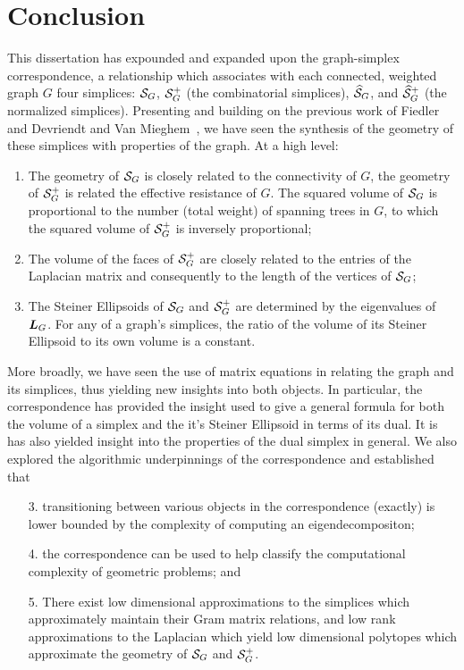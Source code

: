 \chapter{Conclusion}
\label{chap:conclusion}



This dissertation has expounded  and  expanded upon the graph-simplex correspondence, a relationship which associates with each connected, weighted graph $G$ four simplices: $\mathcal{S}_G$, $\mathcal{S}_G^+$ (the combinatorial simplices), $\widehat{\mathcal{S}}_G$, and $\widehat{\mathcal{S}}_G^+$ (the normalized simplices).  
Presenting and building on  the previous work of Fiedler~\cite{fiedler1993geometric,fiedler2011matrices} and Devriendt and Van Mieghem~\cite{devriendt2018simplex}, we have seen the synthesis of the geometry of these  simplices with properties of the graph. At a high  level: 
\begin{enumerate}
	\item The geometry of $\mathcal{S}_G$ is closely related to  the connectivity of $G$, the geometry of  $\mathcal{S}_G^+$ is related the effective resistance of $G$.  The squared volume of $\mathcal{S}_G$ is  proportional to  the number (total weight) of  spanning  trees in $G$,  to which  the  squared volume  of $\mathcal{S}_G^+$ is inversely proportional; 
	\item The volume of the faces of $\mathcal{S}_G^+$ are closely related to the entries  of the Laplacian matrix and consequently to the length of the vertices of $\mathcal{S}_G$;
	\item  The Steiner Ellipsoids of $\mathcal{S}_G$  and $\mathcal{S}_G^+$ are determined by the eigenvalues of $\vb*{L}_G$. For any of a  graph's simplices, the ratio   of the volume  of its Steiner  Ellipsoid  to its  own volume is a constant. 
\end{enumerate}
More broadly,  we  have seen the use of matrix equations in relating the graph and its simplices, thus yielding new insights into  both objects. In  particular,  the correspondence has provided the insight used  to  give a general  formula  for both the volume  of a simplex and the it's Steiner Ellipsoid in terms of its  dual. It is has also yielded  insight into the properties of the dual simplex  in  general. 
We also explored the  algorithmic underpinnings  of  the correspondence and established that 
\begin{enumerate}
	\item[3.] transitioning between various objects in the correspondence (exactly) is lower bounded  by the complexity of computing an eigendecompositon; 
	\item[4.] the correspondence can be used to help classify the computational complexity of geometric problems; and 
	\item[5.] There exist low dimensional  approximations  to the simplices which approximately maintain their Gram matrix relations, and low rank  approximations to the Laplacian  which yield low dimensional polytopes which approximate the geometry  of $\mathcal{S}_G$ and $\mathcal{S}_G^+$. 
\end{enumerate}
